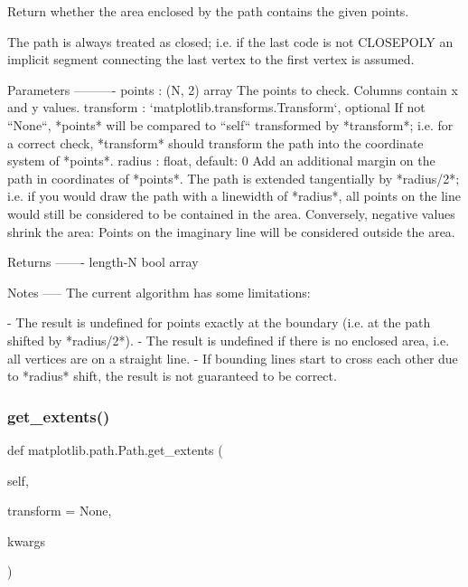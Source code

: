 \begin{DoxyVerb}Return whether the area enclosed by the path contains the given points.

The path is always treated as closed; i.e. if the last code is not
CLOSEPOLY an implicit segment connecting the last vertex to the first
vertex is assumed.

Parameters
----------
points : (N, 2) array
    The points to check. Columns contain x and y values.
transform : `matplotlib.transforms.Transform`, optional
    If not ``None``, *points* will be compared to ``self`` transformed
    by *transform*; i.e. for a correct check, *transform* should
    transform the path into the coordinate system of *points*.
radius : float, default: 0
    Add an additional margin on the path in coordinates of *points*.
    The path is extended tangentially by *radius/2*; i.e. if you would
    draw the path with a linewidth of *radius*, all points on the line
    would still be considered to be contained in the area. Conversely,
    negative values shrink the area: Points on the imaginary line
    will be considered outside the area.

Returns
-------
length-N bool array

Notes
-----
The current algorithm has some limitations:

- The result is undefined for points exactly at the boundary
  (i.e. at the path shifted by *radius/2*).
- The result is undefined if there is no enclosed area, i.e. all
  vertices are on a straight line.
- If bounding lines start to cross each other due to *radius* shift,
  the result is not guaranteed to be correct.
\end{DoxyVerb}
 \mbox{\label{classmatplotlib_1_1path_1_1Path_ab62f364556740604c202f1453184212c}} 
\subsubsection{\texorpdfstring{get\+\_\+extents()}{get\_extents()}}
{\footnotesize\ttfamily def matplotlib.\+path.\+Path.\+get\+\_\+extents (\begin{DoxyParamCaption}\item[{}]{self,  }\item[{}]{transform = {\ttfamily None},  }\item[{}]{kwargs }\end{DoxyParamCaption})}

